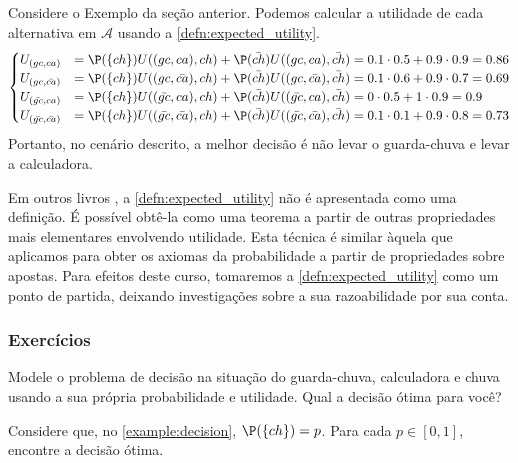 \begin{example}
 \label{example:decision}
 Considere o Exemplo da seção anterior.
 Podemos calcular a utilidade de cada
 alternativa em $\mathcal{A}$
 usando a \cref{defn:expected_utility}.
 \begin{align*}
  \begin{cases}
   U_{(gc,ca)} &= \P(\{ch\})U((gc,ca), ch) + \P(\bar{ch})U((gc,ca), \bar{ch}) = 0.1 \cdot 0.5 + 0.9 \cdot 0.9 = 0.86 \\
   U_{(gc,\bar{ca})} &= \P(\{ch\})U((gc,\bar{ca}), ch) + \P(\bar{ch})U((gc,\bar{ca}), \bar{ch}) = 0.1 \cdot 0.6 + 0.9 \cdot 0.7 = 0.69 \\
   U_{(\bar{gc},ca)} &= \P(\{ch\})U((\bar{gc},ca), ch) + \P(\bar{ch})U((\bar{gc},ca), \bar{ch}) = 0 \cdot 0.5 + 1 \cdot 0.9 = 0.9 \\
   U_{(\bar{gc},\bar{ca})}	&= \P(\{ch\})U((\bar{gc},\bar{ca}), ch) + \P(\bar{ch})U((\bar{gc},\bar{ca}), \bar{ch}) = 0.1 \cdot 0.1 + 0.9 \cdot 0.8 = 0.73
  \end{cases}
 \end{align*}
 Portanto, no cenário descrito, a melhor decisão é
 não levar o guarda-chuva e levar a calculadora. 
\end{example}

Em outros livros \citep{deGroot2005}, 
a \cref{defn:expected_utility} não é apresentada como
uma definição.
É possível obtê-la como uma teorema a partir de
outras propriedades
mais elementares envolvendo utilidade.
Esta técnica é similar àquela que aplicamos para
obter os axiomas da probabilidade a partir de 
propriedades sobre apostas.
Para efeitos deste curso, tomaremos a \cref{defn:expected_utility}
como um ponto de partida,
deixando investigações sobre a
sua razoabilidade por sua conta.

\subsubsection*{Exercícios}

\begin{exercise}
 Modele o problema de decisão na
 situação do guarda-chuva, calculadora e chuva
 usando a sua própria probabilidade e utilidade.
 Qual a decisão ótima para você?
\end{exercise}

\begin{exercise}
 \label{ex:umbrella}
 Considere que, no \cref{example:decision}, 
 $\P(\{ch\})=p$.
 Para cada $p \in [0,1]$,
 encontre a decisão ótima.
\end{exercise}


